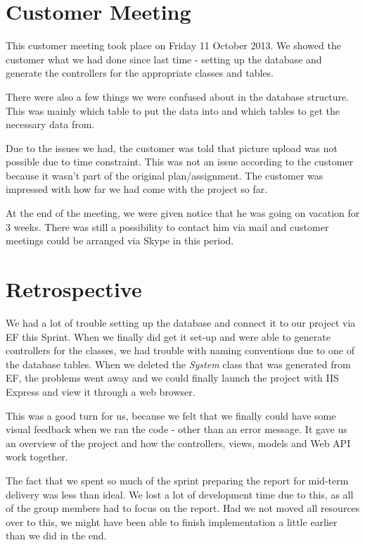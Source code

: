 \section{Customer Meeting}
This customer meeting took place on Friday 11 October 2013. We showed the customer what we had done since last time - setting up the database and generate the controllers for the appropriate classes and tables.

There were also a few things we were confused about in the database structure. This was mainly which table to put the data into and which tables to get the necessary data from.

Due to the issues we had, the customer was told that picture upload was not possible due to time constraint. This was not an issue according to the customer because it wasn't part of the original plan/assignment. The customer was impressed with how far we had come with the project so far.

At the end of the meeting, we were given notice that he was going on vacation for 3 weeks. There was still a possibility to contact him via mail and customer meetings could be arranged via Skype in this period.

\section{Retrospective}
We had a lot of trouble setting up the database and connect it to our project via EF this Sprint. When we finally did get it set-up and were able to generate controllers for the classes, we had trouble with naming conventions due to one of the database tables. When we deleted the \emph{System} class that was generated from EF, the problems went away and we could finally launch the project with IIS Express and view it through a web browser.

This was a good turn for us, because we felt that we finally could have some visual feedback when we ran the code - other than an error message. It gave us an overview of the project and how the controllers, views, models and Web API work together.

The fact that we spent so much of the sprint preparing the report for mid-term delivery was less than ideal. We lost a lot of development time due to this, as all of the group members had to focus on the report. Had we not moved all resources over to this, we might have been able to finish implementation a little earlier than we did in the end.